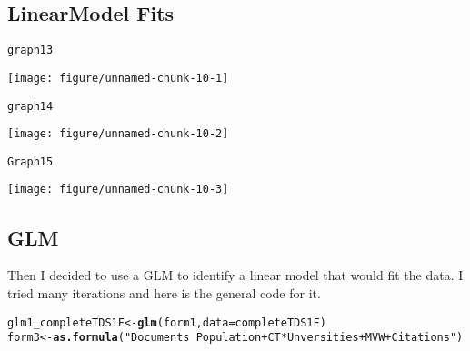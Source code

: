 \documentclass{article}\usepackage[]{graphicx}\usepackage[]{color}
\makeatletter
\def\maxwidth{ %
  \ifdim\Gin@nat@width>\linewidth
    \linewidth
  \else
    \Gin@nat@width
  \fi
}
\newcommand{\hlstr}[1]{\textcolor[rgb]{0.192,0.494,0.8}{#1}}%
\newcommand{\hlstd}[1]{\textcolor[rgb]{0.345,0.345,0.345}{#1}}%
\newcommand{\hlkwb}[1]{\textcolor[rgb]{0.69,0.353,0.396}{#1}}%
\newcommand{\hlkwc}[1]{\textcolor[rgb]{0.333,0.667,0.333}{#1}}%
\newcommand{\hlkwd}[1]{\textcolor[rgb]{0.737,0.353,0.396}{\textbf{#1}}}%
\newenvironment{kframe}{%
 \def\at@end@of@kframe{}%
 \ifinner\ifhmode%
  \def\at@end@of@kframe{\end{minipage}}%
  \begin{minipage}{\columnwidth}%
 \fi\fi%
 \def\FrameCommand##1{\hskip\@totalleftmargin \hskip-\fboxsep
 \colorbox{shadecolor}{##1}\hskip-\fboxsep
     \hskip-\linewidth \hskip-\@totalleftmargin \hskip\columnwidth}%
 \MakeFramed {\advance\hsize-\width
   \@totalleftmargin\z@ \linewidth\hsize
   \@setminipage}}%
 {\par\unskip\endMakeFramed%
 \at@end@of@kframe}
\newenvironment{knitrout}{}{} %
\makeatother
\begin{document}
\subsection{LinearModel Fits}
\begin{knitrout}
\color{fgcolor}\begin{kframe}
\begin{alltt}
\hlstd{graph13}
\end{alltt}
\end{kframe}
\texttt{[image: figure/unnamed-chunk-10-1]} 
\begin{kframe}\begin{alltt}
\hlstd{graph14}
\end{alltt}
\end{kframe}
\texttt{[image: figure/unnamed-chunk-10-2]} 
\begin{kframe}\begin{alltt}
\hlstd{Graph15}
\end{alltt}
\end{kframe}
\texttt{[image: figure/unnamed-chunk-10-3]} 

\end{knitrout}
\subsection{GLM}
Then I decided to use a GLM to identify a linear model that would fit the data. I tried many iterations and here is the general code for it.
\begin{knitrout}
\color{fgcolor}\begin{kframe}
\begin{alltt}
\hlstd{glm1_completeTDS1F} \hlkwb{<-} \hlkwd{glm}\hlstd{(form1,} \hlkwc{data} \hlstd{= completeTDS1F)}
\hlstd{form3} \hlkwb{<-} \hlkwd{as.formula}\hlstd{(}\hlstr{"Documents ~ Population + CT * Unversities + MVW + Citations"}\hlstd{)}
\end{alltt}
\end{kframe}
\end{knitrout}
\end{document}
